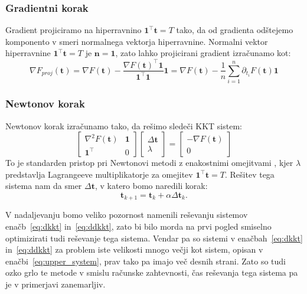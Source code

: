 \documentclass[isrm2, tisk]{fmfdelo}
\newcommand{\tvec}{\mathbf{t}}
\begin{document}
\subsubsection{Gradientni korak}

Gradient projiciramo na hiperravnino $\mathbf{1}^\top \mathbf{t} = T$ tako, da od gradienta odštejemo komponento v smeri normalnega vektorja hiperravnine. Normalni vektor hiperravnine $\mathbf{1}^\top \mathbf{t} = T$ je $\mathbf{n} = \mathbf{1}$, zato lahko projicirani gradient izračunamo kot:
\begin{equation}
    \label{eq:projection}
    \nabla F_{proj}(\tvec) = \nabla F(\tvec) - \frac{\nabla F(\tvec)^\top \mathbf{1}}{\mathbf{1}^\top \mathbf{1}} \mathbf{1} = \nabla F(\tvec) - \frac{1}{n} \sum_{i=1}^n \partial_{t_i} F(\tvec) \mathbf{1}
\end{equation}

\subsubsection{Newtonov korak}
Newtonov korak izračunamo tako, da rešimo sledeči \ac{KKT} sistem:
\begin{equation}
\label{eq:upper_system}
\begin{bmatrix}
    \nabla^2 F(\tvec) & \mathbf{1} \\
    \mathbf{1}^\top & 0
\end{bmatrix}
\begin{bmatrix}
    \Delta \tvec \\
    \lambda
\end{bmatrix}
=
\begin{bmatrix}
    -\nabla F(\tvec) \\
    0
\end{bmatrix}
\end{equation}
To je standarden pristop pri Newtonovi metodi z enakostnimi omejitvami \cite{nocedal2006numerical}, kjer $\lambda$ predstavlja Lagrangeeve multiplikatorje za omejitev $\mathbf{1}^\top \mathbf{t} = T$. Rešitev tega sistema nam da smer $\Delta \tvec$, v katero bomo naredili korak:
\begin{equation}
    \tvec_{k+1} = \tvec_k + \alpha \Delta \tvec_k.
\end{equation}

V nadaljevanju bomo veliko pozornost namenili reševanju sistemov enačb~\eqref{eq:dkkt} in~\eqref{eq:ddkkt}, zato bi bilo morda na prvi pogled smiselno optimizirati tudi reševanje tega sistema. Vendar pa so sistemi v enačbah~\eqref{eq:dkkt} in~\eqref{eq:ddkkt} za problem iste velikosti mnogo večji kot sistem, opisan v enačbi~\eqref{eq:upper_system}, prav tako pa imajo več desnih strani. Zato so tudi ozko grlo te metode v smislu računske zahtevnosti, čas reševanja tega sistema pa je v primerjavi zanemarljiv.
\end{document}
